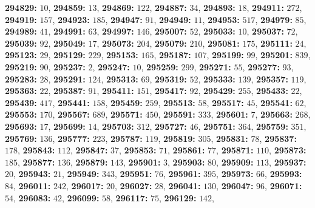 \textsf{\bfseries 294829:} $10$, \textsf{\bfseries 294859:} $13$, \textsf{\bfseries 294869:} $122$, \textsf{\bfseries 294887:} $34$, \textsf{\bfseries 294893:} $18$, \textsf{\bfseries 294911:} $272$, \textsf{\bfseries 294919:} $157$, \textsf{\bfseries 294923:} $185$, \textsf{\bfseries 294947:} $91$, \textsf{\bfseries 294949:} $11$, \textsf{\bfseries 294953:} $517$, \textsf{\bfseries 294979:} $85$, \textsf{\bfseries 294989:} $41$, \textsf{\bfseries 294991:} $63$, \textsf{\bfseries 294997:} $146$, \textsf{\bfseries 295007:} $52$, \textsf{\bfseries 295033:} $10$, \textsf{\bfseries 295037:} $72$, \textsf{\bfseries 295039:} $92$, \textsf{\bfseries 295049:} $17$, \textsf{\bfseries 295073:} $204$, \textsf{\bfseries 295079:} $210$, \textsf{\bfseries 295081:} $175$, \textsf{\bfseries 295111:} $24$, \textsf{\bfseries 295123:} $29$, \textsf{\bfseries 295129:} $229$, \textsf{\bfseries 295153:} $165$, \textsf{\bfseries 295187:} $107$, \textsf{\bfseries 295199:} $99$, \textsf{\bfseries 295201:} $839$, \textsf{\bfseries 295219:} $90$, \textsf{\bfseries 295237:} $2$, \textsf{\bfseries 295247:} $10$, \textsf{\bfseries 295259:} $299$, \textsf{\bfseries 295271:} $55$, \textsf{\bfseries 295277:} $93$, \textsf{\bfseries 295283:} $28$, \textsf{\bfseries 295291:} $124$, \textsf{\bfseries 295313:} $69$, \textsf{\bfseries 295319:} $52$, \textsf{\bfseries 295333:} $139$, \textsf{\bfseries 295357:} $119$, \textsf{\bfseries 295363:} $22$, \textsf{\bfseries 295387:} $91$, \textsf{\bfseries 295411:} $151$, \textsf{\bfseries 295417:} $92$, \textsf{\bfseries 295429:} $255$, \textsf{\bfseries 295433:} $22$, \textsf{\bfseries 295439:} $417$, \textsf{\bfseries 295441:} $158$, \textsf{\bfseries 295459:} $259$, \textsf{\bfseries 295513:} $58$, \textsf{\bfseries 295517:} $45$, \textsf{\bfseries 295541:} $62$, \textsf{\bfseries 295553:} $170$, \textsf{\bfseries 295567:} $689$, \textsf{\bfseries 295571:} $450$, \textsf{\bfseries 295591:} $333$, \textsf{\bfseries 295601:} $7$, \textsf{\bfseries 295663:} $268$, \textsf{\bfseries 295693:} $17$, \textsf{\bfseries 295699:} $14$, \textsf{\bfseries 295703:} $312$, \textsf{\bfseries 295727:} $46$, \textsf{\bfseries 295751:} $364$, \textsf{\bfseries 295759:} $351$, \textsf{\bfseries 295769:} $136$, \textsf{\bfseries 295777:} $223$, \textsf{\bfseries 295787:} $119$, \textsf{\bfseries 295819:} $305$, \textsf{\bfseries 295831:} $78$, \textsf{\bfseries 295837:} $178$, \textsf{\bfseries 295843:} $112$, \textsf{\bfseries 295847:} $37$, \textsf{\bfseries 295853:} $71$, \textsf{\bfseries 295861:} $77$, \textsf{\bfseries 295871:} $110$, \textsf{\bfseries 295873:} $185$, \textsf{\bfseries 295877:} $136$, \textsf{\bfseries 295879:} $143$, \textsf{\bfseries 295901:} $3$, \textsf{\bfseries 295903:} $80$, \textsf{\bfseries 295909:} $113$, \textsf{\bfseries 295937:} $20$, \textsf{\bfseries 295943:} $21$, \textsf{\bfseries 295949:} $343$, \textsf{\bfseries 295951:} $76$, \textsf{\bfseries 295961:} $395$, \textsf{\bfseries 295973:} $66$, \textsf{\bfseries 295993:} $84$, \textsf{\bfseries 296011:} $242$, \textsf{\bfseries 296017:} $20$, \textsf{\bfseries 296027:} $28$, \textsf{\bfseries 296041:} $130$, \textsf{\bfseries 296047:} $96$, \textsf{\bfseries 296071:} $54$, \textsf{\bfseries 296083:} $42$, \textsf{\bfseries 296099:} $58$, \textsf{\bfseries 296117:} $75$, \textsf{\bfseries 296129:} $142$, 
